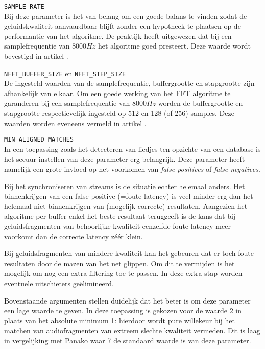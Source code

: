 \begin{description}
	\item\texttt{SAMPLE\_RATE} \hfill \\
	Bij deze parameter is het van belang om een goede balans te vinden zodat de geluidskwaliteit aanvaardbaar blijft zonder een hypotheek te plaatsen op de performantie van het algoritme. De praktijk heeft uitgewezen dat bij een samplefrequentie van $ 8000Hz $ het algoritme goed presteert. Deze waarde wordt bevestigd in artikel \cite{six2015multimodal}.
	\item\texttt{NFFT\_BUFFER\_SIZE} en \texttt{NFFT\_STEP\_SIZE} \hfill \\
	De ingesteld waarden van de samplefrequentie, buffergrootte en stapgrootte zijn afhankelijk van elkaar. Om een goede werking van het FFT algoritme te garanderen bij een samplefrequentie van $ 8000Hz $ worden de buffergrootte en stapgrootte respectievelijk ingesteld op 512 en 128 (of 256) samples. Deze waarden worden eveneens vermeld in artikel \cite{six2015multimodal}.
	\item\texttt{MIN\_ALIGNED\_MATCHES} \hfill \\
	In een toepassing zoals het detecteren van liedjes ten opzichte van een database is het secuur instellen van deze parameter erg belangrijk. Deze parameter heeft namelijk een grote invloed op het voorkomen van \textit{false positives} of \textit{false negatives}. 
	
	Bij het synchroniseren van streams is de situatie echter helemaal anders. Het binnenkrijgen van een false positive (=foute latency) is veel minder erg dan het helemaal niet binnenkrijgen van (mogelijk correcte) resultaten. Aangezien het algoritme per buffer enkel het beste resultaat teruggeeft is de kans dat bij geluidsfragmenten van behoorlijke kwaliteit eenzelfde foute latency meer voorkomt dan de correcte latency zéér klein.
	
	Bij geluidsfragmenten van mindere kwaliteit kan het gebeuren dat er toch foute resultaten door de mazen van het net glippen. Om dit te vermijden is het mogelijk om nog een extra filtering toe te passen. In deze extra stap worden eventuele uitschieters geëlimineerd.
	
	Bovenstaande argumenten stellen duidelijk dat het beter is om deze parameter een lage waarde te geven. In deze toepassing is gekozen voor de waarde 2 in plaats van het absolute minimum 1: hierdoor wordt pure willekeur bij het matchen van audiofragmenten van extreem slechte kwaliteit vermeden. Dit is laag in vergelijking met Panako waar 7 de standaard waarde is van deze parameter.
	

\end{description}
